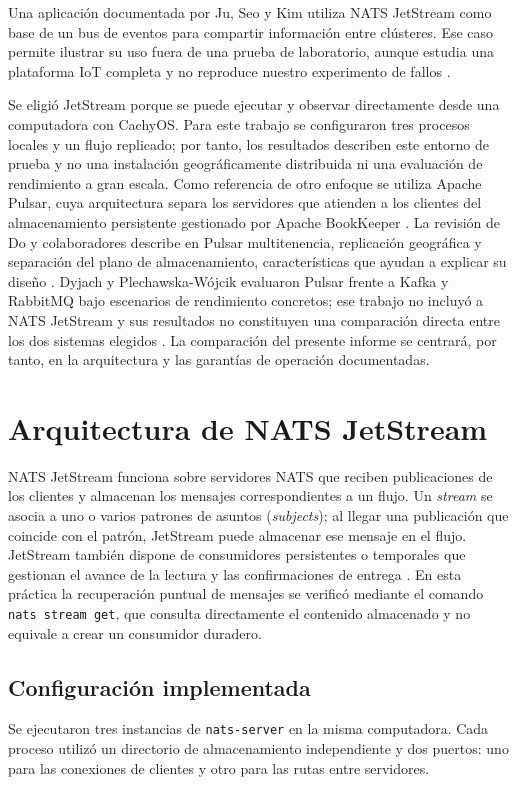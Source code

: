 \documentclass[12pt,a4paper]{article}
\begin{document}
Una aplicación documentada por Ju, Seo y Kim utiliza NATS JetStream como base de un bus de eventos para compartir información entre clústeres. Ese caso permite ilustrar su uso fuera de una prueba de laboratorio, aunque estudia una plataforma IoT completa y no reproduce nuestro experimento de fallos \cite{ju2026}.

Se eligió JetStream porque se puede ejecutar y observar directamente desde una computadora con CachyOS. Para este trabajo se configuraron tres procesos locales y un flujo replicado; por tanto, los resultados describen este entorno de prueba y no una instalación geográficamente distribuida ni una evaluación de rendimiento a gran escala. Como referencia de otro enfoque se utiliza Apache Pulsar, cuya arquitectura separa los servidores que atienden a los clientes del almacenamiento persistente gestionado por Apache BookKeeper \cite{pulsararchitecture}. La revisión de Do y colaboradores describe en Pulsar multitenencia, replicación geográfica y separación del plano de almacenamiento, características que ayudan a explicar su diseño \cite{do2025}. Dyjach y Plechawska-Wójcik evaluaron Pulsar frente a Kafka y RabbitMQ bajo escenarios de rendimiento concretos; ese trabajo no incluyó a NATS JetStream y sus resultados no constituyen una comparación directa entre los dos sistemas elegidos \cite{dyjach2024}. La comparación del presente informe se centrará, por tanto, en la arquitectura y las garantías de operación documentadas.

\section{Arquitectura de NATS JetStream}
NATS JetStream funciona sobre servidores NATS que reciben publicaciones de los clientes y almacenan los mensajes correspondientes a un flujo. Un \emph{stream} se asocia a uno o varios patrones de asuntos (\emph{subjects}); al llegar una publicación que coincide con el patrón, JetStream puede almacenar ese mensaje en el flujo. JetStream también dispone de consumidores persistentes o temporales que gestionan el avance de la lectura y las confirmaciones de entrega \cite{natsjetstream}. En esta práctica la recuperación puntual de mensajes se verificó mediante el comando \texttt{nats stream get}, que consulta directamente el contenido almacenado y no equivale a crear un consumidor duradero.

\subsection{Configuración implementada}
Se ejecutaron tres instancias de \texttt{nats-server} en la misma computadora. Cada proceso utilizó un directorio de almacenamiento independiente y dos puertos: uno para las conexiones de clientes y otro para las rutas entre servidores.
\end{document}
